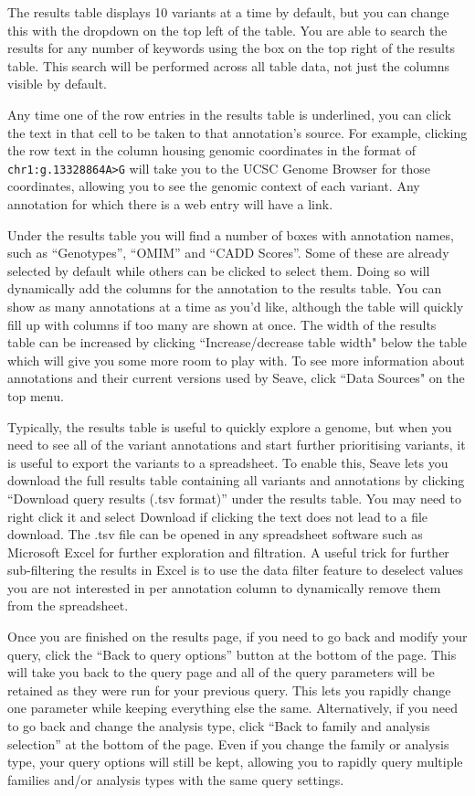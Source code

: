 \documentclass[11pt, a4paper]{article}
\begin{document}
The results table displays 10 variants at a time by default, but you can change this with the dropdown on the top left of the table. You are able to search the results for any number of keywords using the box on the top right of the results table. This search will be performed across all table data, not just the columns visible by default.

Any time one of the row entries in the results table is underlined, you can click the text in that cell to be taken to that annotation's source. For example, clicking the row text in the column housing genomic coordinates in the format of \texttt{chr1:g.13328864A>G} will take you to the UCSC Genome Browser for those coordinates, allowing you to see the genomic context of each variant. Any annotation for which there is a web entry will have a link.

Under the results table you will find a number of boxes with annotation names, such as ``Genotypes'', ``OMIM'' and ``CADD Scores''. Some of these are already selected by default while others can be clicked to select them. Doing so will dynamically add the columns for the annotation to the results table. You can show as many annotations at a time as you'd like, although the table will quickly fill up with columns if too many are shown at once. The width of the results table can be increased by clicking ``Increase/decrease table width" below the table which will give you some more room to play with. To see more information about annotations and their current versions used by Seave, click ``Data Sources" on the top menu.

Typically, the results table is useful to quickly explore a genome, but when you need to see all of the variant annotations and start further prioritising variants, it is useful to export the variants to a spreadsheet. To enable this, Seave lets you download the full results table containing all variants and annotations by clicking ``Download query results (.tsv format)'' under the results table. You may need to right click it and select Download if clicking the text does not lead to a file download. The .tsv file can be opened in any spreadsheet software such as Microsoft Excel for further exploration and filtration. A useful trick for further sub-filtering the results in Excel is to use the data filter feature to deselect values you are not interested in per annotation column to dynamically remove them from the spreadsheet.

Once you are finished on the results page, if you need to go back and modify your query, click the ``Back to query options'' button at the bottom of the page. This will take you back to the query page and all of the query parameters will be retained as they were run for your previous query. This lets you rapidly change one parameter while keeping everything else the same. Alternatively, if you need to go back and change the analysis type, click ``Back to family and analysis selection'' at the bottom of the page. Even if you change the family or analysis type, your query options will still be kept, allowing you to rapidly query multiple families and/or analysis types with the same query settings.
\end{document}

